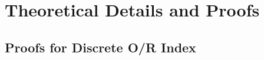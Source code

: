 
\section{Theoretical Details and Proofs}
\label{app:theory_details}

\subsection{Proofs for Discrete O/R Index}
\label{app:proofs_discrete}

